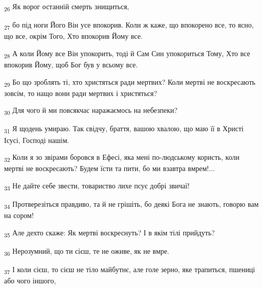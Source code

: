 \begin{tcolorbox}
\textsubscript{26} Як ворог останній смерть знищиться,
\end{tcolorbox}
\begin{tcolorbox}
\textsubscript{27} бо під ноги Його Він усе впокорив. Коли ж каже, що впокорено все, то ясно, що все, окрім Того, Хто впокорив Йому все.
\end{tcolorbox}
\begin{tcolorbox}
\textsubscript{28} А коли Йому все Він упокорить, тоді й Сам Син упокориться Тому, Хто все впокорив Йому, щоб Бог був у всьому все.
\end{tcolorbox}
\begin{tcolorbox}
\textsubscript{29} Бо що зроблять ті, хто христяться ради мертвих? Коли мертві не воскресають зовсім, то нащо вони ради мертвих і христяться?
\end{tcolorbox}
\begin{tcolorbox}
\textsubscript{30} Для чого й ми повсякчас наражаємось на небезпеки?
\end{tcolorbox}
\begin{tcolorbox}
\textsubscript{31} Я щодень умираю. Так свідчу, браття, вашою хвалою, що маю її в Христі Ісусі, Господі нашім.
\end{tcolorbox}
\begin{tcolorbox}
\textsubscript{32} Коли я зо звірами боровся в Ефесі, яка мені по-людському користь, коли мертві не воскресають? Будем їсти та пити, бо ми взавтра вмрем!...
\end{tcolorbox}
\begin{tcolorbox}
\textsubscript{33} Не дайте себе звести, товариство лихе псує добрі звичаї!
\end{tcolorbox}
\begin{tcolorbox}
\textsubscript{34} Протверезіться правдиво, та й не грішіть, бо деякі Бога не знають, говорю вам на сором!
\end{tcolorbox}
\begin{tcolorbox}
\textsubscript{35} Але дехто скаже: Як мертві воскреснуть? І в якім тілі прийдуть?
\end{tcolorbox}
\begin{tcolorbox}
\textsubscript{36} Нерозумний, що ти сієш, те не оживе, як не вмре.
\end{tcolorbox}
\begin{tcolorbox}
\textsubscript{37} І коли сієш, то сієш не тіло майбутнє, але голе зерно, яке трапиться, пшениці або чого іншого,
\end{tcolorbox}
